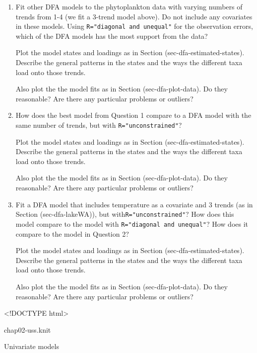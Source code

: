 \documentclass[
  12pt,
]{book}
\begin{document}
\begin{enumerate}
\def\labelenumi{\arabic{enumi}.}
\item
  Fit other DFA models to the phytoplankton data with varying numbers
  of trends from 1-4 (we fit a 3-trend model above). Do not include
  any covariates in these models. Using \texttt{R="diagonal\ and\ unequal"} for
  the observation errors, which of the DFA models has the most support
  from the data?

  Plot the model states and loadings as in Section
  \citet{ref}(sec-dfa-estimated-states). Describe the general patterns in the
  states and the ways the different taxa load onto those trends.

  Also plot the the model fits as in Section \citet{ref}(sec-dfa-plot-data).
  Do they reasonable? Are there any particular problems or outliers?
\item
  How does the best model from Question 1 compare to a DFA model with
  the same number of trends, but with \texttt{R="unconstrained"}?

  Plot the model states and loadings as in Section
  \citet{ref}(sec-dfa-estimated-states). Describe the general patterns in the
  states and the ways the different taxa load onto those trends.

  Also plot the the model fits as in Section \citet{ref}(sec-dfa-plot-data).
  Do they reasonable? Are there any particular problems or outliers?
\item
  Fit a DFA model that includes temperature as a covariate and 3
  trends (as in Section \citet{ref}(sec-dfa-lakeWA)), but
  with\texttt{R="unconstrained"}? How does this model compare to the model
  with \texttt{R="diagonal\ and\ unequal"}? How does it compare to the model in
  Question 2?

  Plot the model states and loadings as in Section
  \citet{ref}(sec-dfa-estimated-states). Describe the general patterns in the
  states and the ways the different taxa load onto those trends.

  Also plot the the model fits as in Section \citet{ref}(sec-dfa-plot-data).
  Do they reasonable? Are there any particular problems or outliers?
\end{enumerate}

\textless!DOCTYPE html\textgreater{}

chap02-uss.knit

\hypertarget{header}{}

\hypertarget{sec-uss-head}{}
Univariate models
\end{document}
